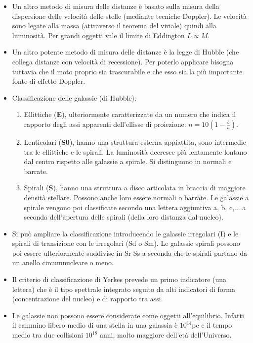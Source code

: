 \documentclass[11pt,a4paper]{article}
\begin{document}
\begin{itemize}
\item Un altro metodo di misura delle distanze è basato sulla misura della dispersione delle velocità delle stelle (mediante tecniche Doppler). Le velocità sono legate alla massa (attraverso il teorema del viriale) quindi alla luminosità. Per grandi oggetti vale il limite di Eddington $L \propto M$.

\item Un altro potente metodo di misura delle distanze è la legge di Hubble (che collega distanze con velocità di recessione). Per poterlo applicare bisogna tuttavia che il moto proprio sia trascurabile e che esso sia la più importante fonte di effetto Doppler.

\item Classificazione delle galassie (di Hubble):
\begin{enumerate}
\item Ellittiche (\textbf{E}), ulteriormente caratterizzate da un numero che indica il rapporto degli assi apparenti dell'ellisse di proiezione: $n = 10 \left( 1 - \frac{b}{a} \right)$.
\item Lenticolari (\textbf{S0}), hanno una struttura esterna appiattita, sono intermedie tra le ellittiche e le spirali. La luminosità decresce più lentamente lontano dal centro rispetto alle galassie a spirale. Si distinguono in normali e barrate.
\item Spirali (\textbf{S}), hanno una struttura a disco articolata in braccia di maggiore densità stellare. Possono anche loro essere normali o barrate. Le galassie a spirale vengono poi classificate secondo una lettera aggiuntiva a, b, c,... a seconda dell'apertura delle spirali (della loro distanza dal nucleo).
\end{enumerate}

\item Si può ampliare la classificazione introducendo le galassie irregolari (I) e le spirali di transizione con le irregolari (Sd o Sm). Le galassie spirali possono poi essere ulteriormente suddivise in Sr Ss a seconda che le spirali partano da un anello circumnucleare o meno.

\item Il criterio di classificazione di Yerkes prevede un primo indicatore (una lettera) che è il tipo spettrale integrato seguito da alti indicatori di forma (concentrazione del nucleo) e di rapporto tra assi.

\item Le galassie non possono essere considerate come oggetti all'equilibrio. Infatti il cammino libero medio di una stella in una galassia è $10^{14}$pc e il tempo medio tra due collisioni $10^{18}$ anni, molto maggiore dell'età dell'Universo.


\end{itemize}
\end{document}
